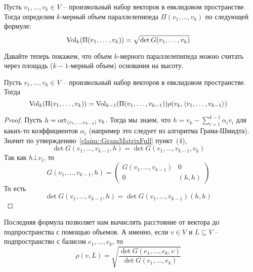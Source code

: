 \begin{definition}
Пусть $v_1,\ldots, v_k\in V$ -- произвольный набор векторов в евклидовом пространстве.
Тогда определим $k$-мерный объем параллелепипеда $\Pi(v_1,\ldots,v_k)$ по следующей формуле:
\[
\operatorname{Vol}_k(\Pi(v_1,\ldots,v_k)) = \sqrt{\det G(v_1,\ldots,v_k)}
\]
\end{definition}

Давайте теперь покажем, что объем $k$-мерного параллелепипеда можно считать через площадь ($k-1$-мерный объем) основания на высоту.

\begin{claim}
Пусть $v_1,\ldots,v_k\in V$ -- произвольный набор векторов в евклидовом пространстве.
Тогда
\[
\operatorname{Vol}_k(\Pi(v_1,\ldots,v_k)) = \operatorname{Vol}_{k-1}(\Pi(v_1,\ldots,v_{k-1}))\rho(v_k, \langle v_1,\ldots,v_{k-1}\rangle)
\] 
\end{claim}
\begin{proof}
Пусть $h = \operatorname{ort}_{\langle v_1,\ldots,v_{k-1}\rangle} v_k$.
Тогда мы знаем, что $h = v_k - \sum_{i=1}^{k-1}\alpha_i v_i$ для каких-то коэффициентов $\alpha_i$ (например это следует из алгоритма Грама-Шмидта).
Значит по утверждению~\ref{claim::GramMatrixFull} пункт~(4),
\[
\det G(v_1,\ldots,v_{k-1}, h) = \det G(v_1,\ldots,v_{k-1},v_k)
\]
Так как $h \bot v_i$, то 
\[
G(v_1,\ldots,v_{k-1}, h) = 
\begin{pmatrix}
{G(v_1,\ldots,v_{k-1})}&{0}\\
{0}&{(h, h)}
\end{pmatrix}
\]
То есть 
\[
\det G(v_1,\ldots,v_{k-1}, h) = \det G(v_1,\ldots, v_{k-1}) (h, h)
\]
\end{proof}


Последняя формула позволяет нам вычислять расстояние от вектора до подпространства с помощью объемов.
А именно, если $v\in V$ и $L\subseteq V$ -- подпространство с базисом $e_1,\ldots,e_k$, то 
\[
\rho(v, L) = \sqrt{\frac{\det G(e_1,\ldots,e_k, v)}{\det G(e_1,\ldots,e_k)}}
\]

